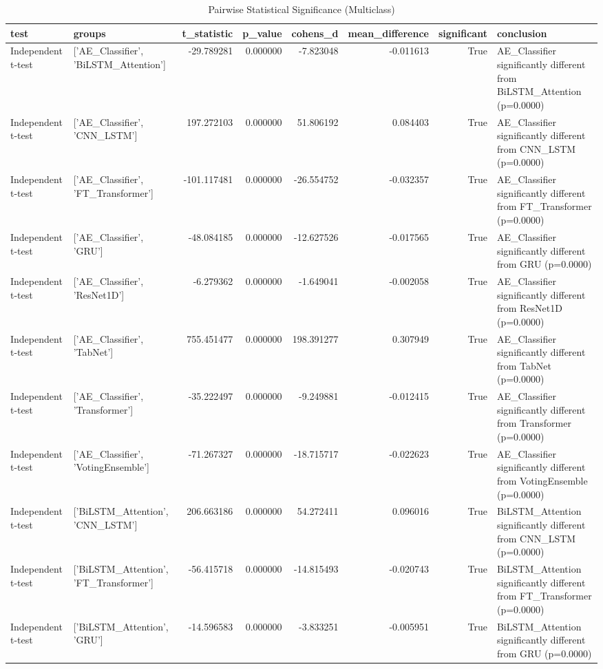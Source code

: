 \begin{table}
\caption{Pairwise Statistical Significance (Multiclass)}
\label{tab:stat_tests_multiclass}
\begin{tabular}{llrrrrrl}
\toprule
test & groups & t_statistic & p_value & cohens_d & mean_difference & significant & conclusion \\
\midrule
Independent t-test & ['AE_Classifier', 'BiLSTM_Attention'] & -29.789281 & 0.000000 & -7.823048 & -0.011613 & True & AE_Classifier significantly different from BiLSTM_Attention (p=0.0000) \\
Independent t-test & ['AE_Classifier', 'CNN_LSTM'] & 197.272103 & 0.000000 & 51.806192 & 0.084403 & True & AE_Classifier significantly different from CNN_LSTM (p=0.0000) \\
Independent t-test & ['AE_Classifier', 'FT_Transformer'] & -101.117481 & 0.000000 & -26.554752 & -0.032357 & True & AE_Classifier significantly different from FT_Transformer (p=0.0000) \\
Independent t-test & ['AE_Classifier', 'GRU'] & -48.084185 & 0.000000 & -12.627526 & -0.017565 & True & AE_Classifier significantly different from GRU (p=0.0000) \\
Independent t-test & ['AE_Classifier', 'ResNet1D'] & -6.279362 & 0.000000 & -1.649041 & -0.002058 & True & AE_Classifier significantly different from ResNet1D (p=0.0000) \\
Independent t-test & ['AE_Classifier', 'TabNet'] & 755.451477 & 0.000000 & 198.391277 & 0.307949 & True & AE_Classifier significantly different from TabNet (p=0.0000) \\
Independent t-test & ['AE_Classifier', 'Transformer'] & -35.222497 & 0.000000 & -9.249881 & -0.012415 & True & AE_Classifier significantly different from Transformer (p=0.0000) \\
Independent t-test & ['AE_Classifier', 'VotingEnsemble'] & -71.267327 & 0.000000 & -18.715717 & -0.022623 & True & AE_Classifier significantly different from VotingEnsemble (p=0.0000) \\
Independent t-test & ['BiLSTM_Attention', 'CNN_LSTM'] & 206.663186 & 0.000000 & 54.272411 & 0.096016 & True & BiLSTM_Attention significantly different from CNN_LSTM (p=0.0000) \\
Independent t-test & ['BiLSTM_Attention', 'FT_Transformer'] & -56.415718 & 0.000000 & -14.815493 & -0.020743 & True & BiLSTM_Attention significantly different from FT_Transformer (p=0.0000) \\
Independent t-test & ['BiLSTM_Attention', 'GRU'] & -14.596583 & 0.000000 & -3.833251 & -0.005951 & True & BiLSTM_Attention significantly different from GRU (p=0.0000) \\

\end{tabular}
\end{table}
